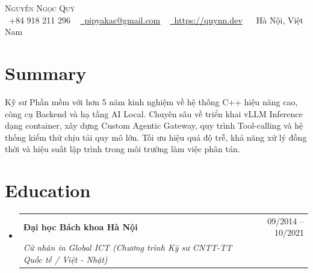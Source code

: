 \documentclass[letterpaper,10pt]{article}
\makeatletter
\newcommand{\resumeSubheading}[4]{
  \vspace{1pt}\item
    \begin{tabular*}{0.97\textwidth}[t]{l@{\extracolsep{\fill}}r}
      \textbf{#1} & #2 \\
      \textit{\small#3} & \textit{\small #4} \\
    \end{tabular*}\vspace{-2pt}
}
\newcommand{\resumeSubHeadingListStart}{\begin{itemize}[leftmargin=0.15in, label={}, itemsep=2pt]}
\newcommand{\resumeSubHeadingListEnd}{\end{itemize}\vspace{2pt}}
\makeatother
\begin{document}
\begin{center}
    {\Huge \scshape Nguyễn Ngọc Quý} \\ \vspace{1pt}
    \small
    \raisebox{-0.1\height}\faPhone\ +84 918 211 296 ~
    \href{mailto:pipyakas@gmail.com}{\raisebox{-0.2\height}\faEnvelope\ pipyakas@gmail.com} ~
    \href{https://quynn.dev}{\raisebox{-0.2\height}\faLink\ https://quynn.dev} ~
    \raisebox{-0.1\height}\faMapMarker\ Hà Nội, Việt Nam
\end{center}

\section{Summary}
Kỹ sư Phần mềm với hơn 5 năm kinh nghiệm về hệ thống C++ hiệu năng cao, công cụ Backend và hạ tầng AI Local. Chuyên sâu về triển khai vLLM Inference dạng container, xây dựng Custom Agentic Gateway, quy trình Tool-calling và hệ thống kiểm thử chịu tải quy mô lớn. Tối ưu hiệu quả độ trễ, khả năng xử lý đồng thời và hiệu suất lập trình trong môi trường làm việc phân tán.

\section{Education}
  \resumeSubHeadingListStart
    \resumeSubheading
      {Đại học Bách khoa Hà Nội}{09/2014 -- 10/2021}
      {Cử nhân in Global ICT (Chương trình Kỹ sư CNTT-TT Quốc tế / Việt - Nhật)}{}
  \resumeSubHeadingListEnd

\end{document}
